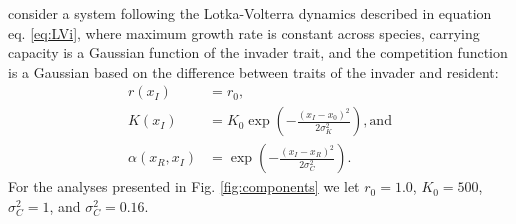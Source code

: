 \documentclass[a4paper,11pt]{article}
\newcommand{\todo}[1]{{\color{navy}{(todo: #1)}}}
\begin{document}
\citet{Dieckmann-1999} consider a system following the Lotka-Volterra dynamics described in equation eq. \ref{eq:LVi}, where maximum growth rate is constant across species, carrying capacity is a Gaussian function of the invader trait, and the competition function is a Gaussian based on the difference between traits of the invader and resident:
\begin{subequations}
\begin{align}
\label{eq:DD}
r(x_I) &= r_0, \\
K(x_I) &= K_0 \exp\left(-\frac{\left(x_I-x_0\right)^2}{2\sigma^2_K}\right), \textrm{and}\\
\alpha(x_R, x_I) &= \exp\left(-\frac{\left(x_I-x_R\right)^2}{2\sigma^2_C}\right).
\end{align}
\end{subequations}
For the analyses presented in Fig. \ref{fig:components} we let $r_0=1.0$, $K_0=500$, $\sigma^2_C=1$, and $\sigma^2_C=0.16$. \todo{of these should be $\sigma^2_K$}
\end{document}
